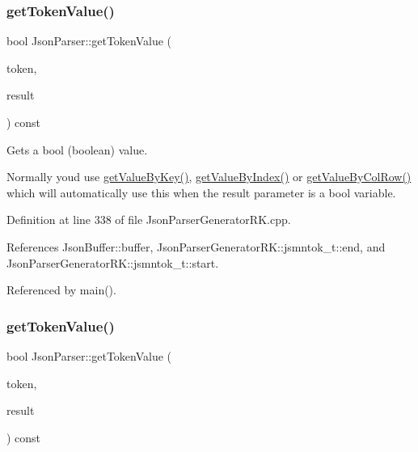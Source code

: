 \subsubsection{\texorpdfstring{get\+Token\+Value()}{getTokenValue()}\hspace{0.1cm}{\footnotesize\ttfamily [1/8]}}
{\footnotesize\ttfamily bool Json\+Parser\+::get\+Token\+Value (\begin{DoxyParamCaption}\item[{const \hyperlink{struct_json_parser_generator_r_k_1_1jsmntok__t}{Json\+Parser\+Generator\+R\+K\+::jsmntok\+\_\+t} $\ast$}]{token,  }\item[{bool \&}]{result }\end{DoxyParamCaption}) const}



Gets a bool (boolean) value. 

Normally you\textquotesingle{}d use \hyperlink{class_json_parser_a13abcdcb2341f65ac358bb4d81007d06}{get\+Value\+By\+Key()}, \hyperlink{class_json_parser_a53bd8a6ebb0d9b246b876653e792368f}{get\+Value\+By\+Index()} or \hyperlink{class_json_parser_af1f4a3a65b5cc9cd19b129c410aa78e0}{get\+Value\+By\+Col\+Row()} which will automatically use this when the result parameter is a bool variable. 

Definition at line 338 of file Json\+Parser\+Generator\+R\+K.\+cpp.



References Json\+Buffer\+::buffer, Json\+Parser\+Generator\+R\+K\+::jsmntok\+\_\+t\+::end, and Json\+Parser\+Generator\+R\+K\+::jsmntok\+\_\+t\+::start.



Referenced by main().

\mbox{\label{class_json_parser_a875e5b4b01c9cd597e09b13e59fe6252}} 
\subsubsection{\texorpdfstring{get\+Token\+Value()}{getTokenValue()}\hspace{0.1cm}{\footnotesize\ttfamily [2/8]}}
{\footnotesize\ttfamily bool Json\+Parser\+::get\+Token\+Value (\begin{DoxyParamCaption}\item[{const \hyperlink{struct_json_parser_generator_r_k_1_1jsmntok__t}{Json\+Parser\+Generator\+R\+K\+::jsmntok\+\_\+t} $\ast$}]{token,  }\item[{int \&}]{result }\end{DoxyParamCaption}) const}



